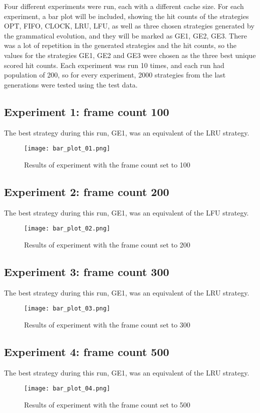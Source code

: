 Four different experiments were run, each with a different cache size. For each experiment, a bar plot will be included, showing the hit counts of the strategies OPT, FIFO, CLOCK, LRU, LFU, as well as three chosen strategies generated by the grammatical evolution, and they will be marked as GE1, GE2, GE3. There was a lot of repetition in the generated strategies and the hit counts, so the values for the strategies GE1, GE2 and GE3 were chosen as the three best unique scored hit counts. Each experiment was run 10 times, and each run had population of 200, so for every experiment, 2000 strategies from the last generations were tested using the test data.

\newpage
\subsection{Experiment 1: frame count 100}
The best strategy during this run, GE1, was an equivalent of the LRU strategy.
\begin{figure}[H]
	\centering
	\texttt{[image: bar\_plot\_01.png]}
	\caption{Results of experiment with the frame count set to 100}
\end{figure}

\subsection{Experiment 2: frame count 200}
The best strategy during this run, GE1, was an equivalent of the LFU strategy.
\begin{figure}[H]
	\centering
	\texttt{[image: bar\_plot\_02.png]}
	\caption{Results of experiment with the frame count set to 200}
\end{figure}

\newpage
\subsection{Experiment 3: frame count 300}
The best strategy during this run, GE1, was an equivalent of the LRU strategy.
\begin{figure}[H]
	\centering
	\texttt{[image: bar\_plot\_03.png]}
	\caption{Results of experiment with the frame count set to 300}
\end{figure}

\subsection{Experiment 4: frame count 500}
The best strategy during this run, GE1, was an equivalent of the LRU strategy.
\begin{figure}[H]
	\centering
	\texttt{[image: bar\_plot\_04.png]}
	\caption{Results of experiment with the frame count set to 500}
\end{figure}

